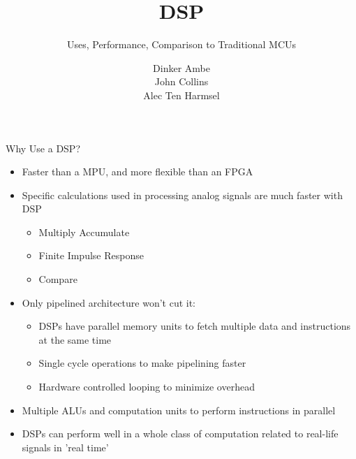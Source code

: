 \documentclass{beamer}
\begin{document}
\beamertemplatenavigationsymbolsempty

\title{DSP}
\subtitle{Uses, Performance, Comparison to Traditional MCUs}
\author{Dinker Ambe\\
John Collins\\
Alec Ten Harmsel}


\frame{\titlepage}

\begin{frame}{Why Use a DSP?}
    \begin{itemize}
        \item Faster than a MPU, and more flexible than an FPGA
        \item Specific calculations used in processing analog signals are much faster with DSP
	\begin{itemize}
                \item Multiply Accumulate 
                \item Finite Impulse Response
                \item Compare
        \end{itemize}
        \item Only pipelined architecture won't cut it:
	\begin{itemize}
                \item DSPs have parallel memory units to fetch multiple data and instructions at the same time
                \item Single cycle operations to make pipelining faster
                \item Hardware controlled looping to minimize overhead
        \end{itemize}
        \item Multiple ALUs and computation units to perform instructions in parallel
        \item DSPs can perform well in a whole class of computation related to real-life signals in 'real time'
    \end{itemize}
\end{frame}
\end{document}
